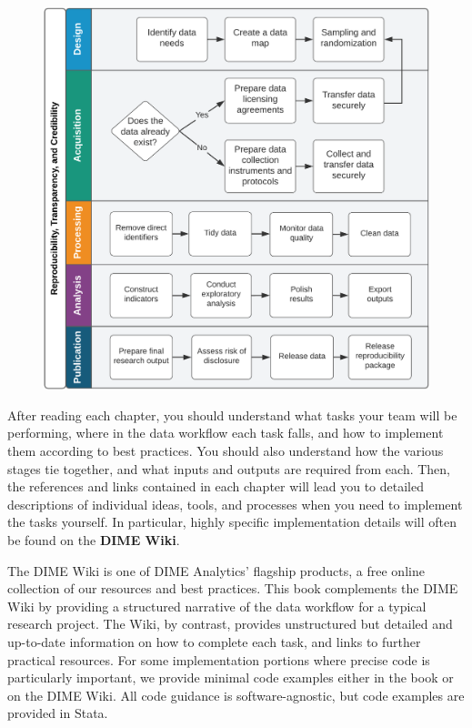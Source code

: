\begin{fullwidth}
\begin{figure}
	\centering
	\includegraphics[width=1.25\linewidth]{diagrams/Intro}
	\caption{}
	\label{fig:intro}
\end{figure}
\end{fullwidth}

After reading each chapter, you should understand
what tasks your team will be performing,
where in the data workflow each task falls,
and how to implement them according to best practices.
You should also understand how the various stages tie together,
and what inputs and outputs are required from each.
Then, the references and links contained in each chapter
will lead you to detailed descriptions of individual
ideas, tools, and processes when you need to implement the tasks yourself.
In particular, highly specific implementation details
will often be found on the \textbf{DIME Wiki}.

The DIME Wiki is one of DIME Analytics' flagship products,
a free online collection of our resources and best practices.
This book complements the DIME Wiki by providing a structured narrative
of the data workflow for a typical research project.
The Wiki, by contrast, provides unstructured but detailed and up-to-date information
on how to complete each task, and links to further practical resources.
For some implementation portions where precise code is particularly important,
we provide minimal code examples either in the book or on the DIME Wiki.
All code guidance is software-agnostic, but code examples are provided in Stata.

